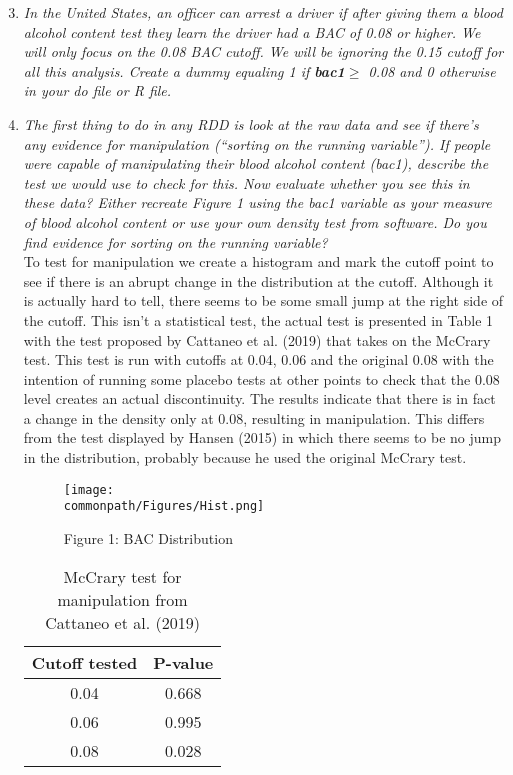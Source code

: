 \documentclass[11pt, letterpaper]{article}
\newcommand*{\commonpath}{C:/Users/Nicolás Urdaneta/Documents/GitHub/RDD}
\begin{document}
\begin{enumerate}
	\setcounter{enumi}{2}
	\item \textit{In the United States, an officer can arrest a driver if  after giving them a blood alcohol content test they learn the driver had a BAC of 0.08 or higher.  We will only focus on the 0.08 BAC cutoff. We will be ignoring the 0.15 cutoff for all this analysis. Create a dummy equaling 1 if \textbf{bac1}$\geq$ 0.08 and 0 otherwise in your do file or R file.}

	\item \textit{The first thing to do in any RDD is look at the raw data and see if there’s any evidence for manipulation (``sorting on the running variable'').  If people were capable of manipulating their blood alcohol content (bac1), describe the test we would use to check for this.  Now evaluate whether you see this in these data?  Either recreate Figure 1 using the bac1 variable as your measure of blood alcohol content or use your own density test from software.  Do you find evidence for sorting on the running variable? } \\

	To test for manipulation we create a histogram and mark the cutoff point to see if there is an abrupt change in the distribution at the cutoff. Although it is actually hard to tell, there seems to be some small jump at the right side of the cutoff. This isn't a statistical test, the actual test is presented in Table 1 with the test proposed by Cattaneo et al. (2019) that takes on the McCrary test. This test is run with cutoffs at 0.04, 0.06 and the original 0.08 with the intention of running some placebo tests at other points to check that the 0.08 level creates an actual discontinuity. The results indicate that there is in fact a change in the density only at 0.08, resulting in manipulation. This differs from the test displayed by Hansen (2015) in which there seems to be no jump in the distribution, probably because he used the original McCrary test.  \\

	\begin{figure}[H]
		\centering
		\caption*{Figure 1: BAC Distribution}
		\texttt{[image: \\commonpath/Figures/Hist.png]}
	\end{figure}

	\begin{table}[H]
		\centering
		\caption{McCrary test for manipulation from Cattaneo et al. (2019)}
		\begin{tabular}{cc}
		\toprule
		Cutoff tested & P-value \\ \hline
		0.04 & 0.668 \\
		0.06 & 0.995 \\
		0.08 & 0.028 \\ \hline \hline
		\end{tabular}
	\end{table}



\end{enumerate}
\end{document}
